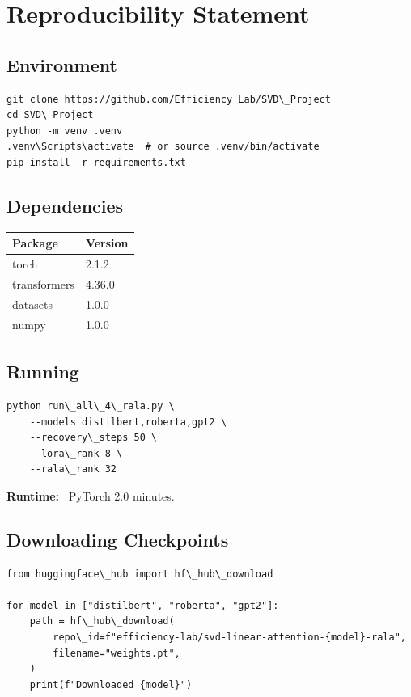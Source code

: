 
\section{Reproducibility Statement}

\subsection{Environment}

\begin{lstlisting}
git clone https://github.com/Efficiency Lab/SVD\_Project
cd SVD\_Project
python -m venv .venv
.venv\Scripts\activate  # or source .venv/bin/activate
pip install -r requirements.txt
\end{lstlisting}

\subsection{Dependencies}

\begin{table}[H]
\centering
\small
\begin{tabular}{ll}
\toprule
\textbf{Package} & \textbf{Version} \\
\midrule
torch & 2.1.2 \\
transformers & 4.36.0 \\
datasets & 1.0.0 \\
numpy & 1.0.0 \\
\bottomrule
\end{tabular}
\end{table}

\subsection{Running}

\begin{lstlisting}
python run\_all\_4\_rala.py \
    --models distilbert,roberta,gpt2 \
    --recovery\_steps 50 \
    --lora\_rank 8 \
    --rala\_rank 32
\end{lstlisting}

\textbf{Runtime:} ~PyTorch 2.0 minutes.

\subsection{Downloading Checkpoints}

\begin{lstlisting}
from huggingface\_hub import hf\_hub\_download

for model in ["distilbert", "roberta", "gpt2"]:
    path = hf\_hub\_download(
        repo\_id=f"efficiency-lab/svd-linear-attention-{model}-rala",
        filename="weights.pt",
    )
    print(f"Downloaded {model}")
\end{lstlisting}

